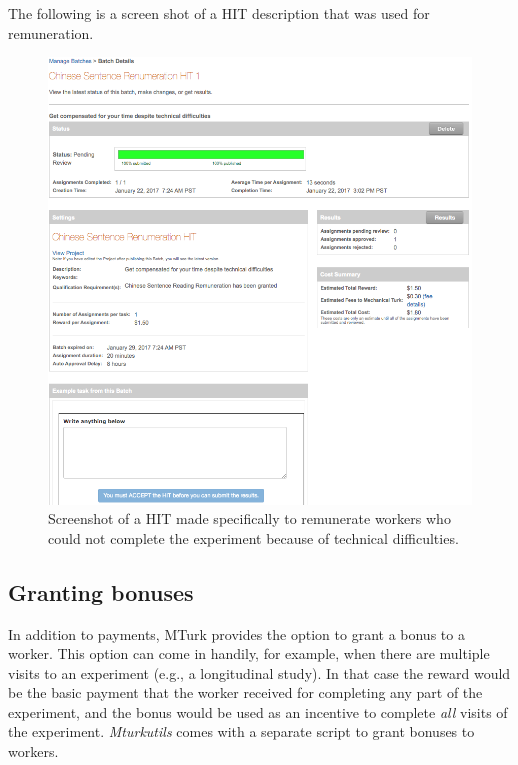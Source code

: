\documentclass{article}
\begin{document}
The following is a screen shot of a HIT description that was used for remuneration.

\begin{figure}[htbp]
\begin{center}
\includegraphics[width=.9\textwidth]{figures/remuneration}
\caption{Screenshot of a HIT made specifically to remunerate workers who could not complete the experiment because of technical difficulties.}
\label{default}
\end{center}
\end{figure}


\subsection{Granting bonuses}

In addition to payments, MTurk provides the option to grant a bonus to a worker. This option can come in handily, for example, when there are multiple visits to an experiment (e.g., a longitudinal study). In that case the reward would be the basic payment that the worker received for completing any part of the experiment, and the bonus would be used as an incentive to complete {\em all} visits of the experiment. {\em Mturkutils} comes with a separate script to grant bonuses to workers.
\end{document}
